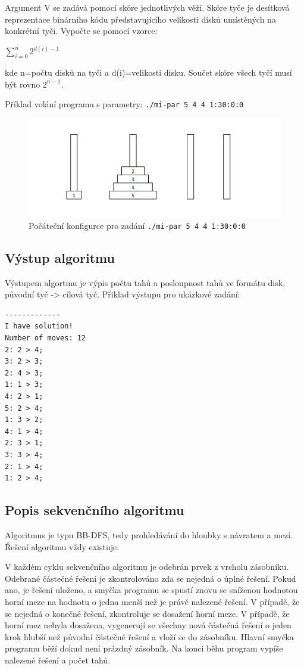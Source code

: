 \documentclass[12pt]{article}
\begin{document}
Argument V se zadává pomocí skóre jednotlivých věží. Skóre tyče je desítková reprezentace binárního kódu představujícího velikosti disků umístěných na konkrétní tyči. Vypočte se pomocí vzorce:
\begin{center}
$\displaystyle\sum\limits_{i=0}^n {2^{d(i)-1}}$
\end{center}
 kde n=počtu disků na tyči a d(i)=velikosti disku. Součet skóre všech tyčí musí být rovno $2^{n-1}$.

Příklad volání programu s parametry:
\texttt{./mi-par 5 4 4 1:30:0:0}

\begin{figure}[h]
\begin{center}
\includegraphics[width=140mm]{5-4-4.png}
\caption{Počáteční konfigurce pro zadání \texttt{./mi-par 5 4 4 1:30:0:0}}
\end{center}
\end{figure}



\subsection{Výstup algoritmu}
Výstupem algortmu je výpis počtu tahů a posloupnost tahů ve formátu disk, původní tyč -> cílová tyč.
Přiklad výstupu pro ukázkové zadání:

\begin{verbatim}
-------------
I have solution!
Number of moves: 12
2: 2 > 4;
3: 2 > 3;
2: 4 > 3;
1: 1 > 3;
4: 2 > 1;
5: 2 > 4;
1: 3 > 2;
4: 1 > 4;
2: 3 > 1;
3: 3 > 4;
2: 1 > 4;
1: 2 > 4;
\end{verbatim}
\subsection{Popis sekvenčního algoritmu}
Algoritmus je typu BB-DFS, tedy prohledávání do hloubky s návratem a mezí.
Řešení algoritmu vždy existuje. 

V každém cyklu sekvenčního algoritmu je odebrán prvek z vrcholu zásobníku.
Odebrané částečné řešení je zkontrolováno zda se nejedná o úplné řešení. Pokud
ano, je řešení uloženo, a smyčka programu se spustí znovu se sníženou hodnotou
horní meze na hodnotu o jedna menší než je právě nalezené řešení. V případě, že
se nejedná o konečné řešení, zkontroluje se dosažení horní meze. V případě, že
horní mez nebyla dosažena, vygenerují se všechny nová částečná řešení o jeden
krok hlubší než původní částečné řešení a vloží se do zásobníku. Hlavní smyčka
programu běží dokud není prázdný zásobník. Na konci běhu program vypíše nalezené
řešení a počet tahů.
\end{document}
